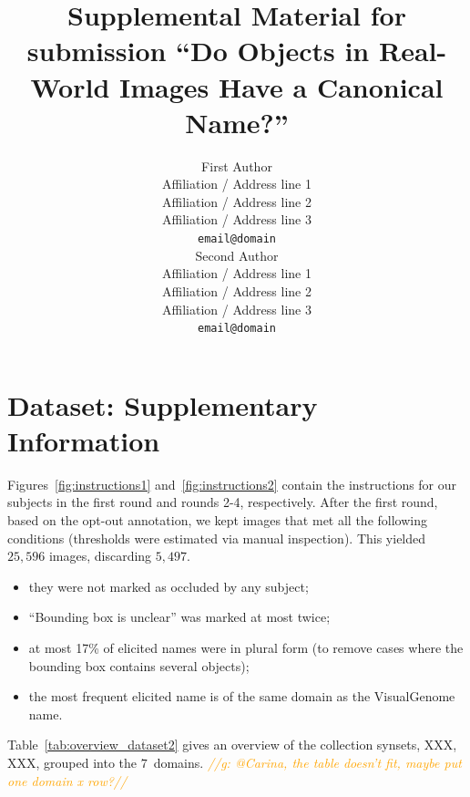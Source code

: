 \documentclass[11pt,a4paper]{article}
\title{Supplemental Material for submission ``Do Objects in Real-World Images Have a Canonical Name?''}
\author{First Author \\
  Affiliation / Address line 1 \\
  Affiliation / Address line 2 \\
  Affiliation / Address line 3 \\
  {\tt email@domain} \\\And
  Second Author \\
  Affiliation / Address line 1 \\
  Affiliation / Address line 2 \\
  Affiliation / Address line 3 \\
  {\tt email@domain} \\}
\date{}
\newcommand{\vgenome}{VisualGenome\xspace}
\newcommand{\gbt}[1]{\textcolor{orange}{\emph{//g: #1//}}}
\begin{document}
\maketitle
\section{Dataset: Supplementary Information}
\label{app:instructions}

Figures~\ref{fig:instructions1} and~\ref{fig:instructions2} contain the instructions for our subjects in the first round and rounds 2-4, respectively.
After the first round, based on the opt-out annotation, we kept images that met all the following conditions (thresholds were estimated via manual inspection). This yielded $25,596$ images, discarding $5,497$.

\begin{itemize}
\item they were not marked as occluded by any subject;
\item ``Bounding box is unclear'' was marked at most twice;
\item at most 17\% of elicited names were in plural form (to remove cases where the bounding box contains several objects);
\item the most frequent elicited name is of the same domain as the \vgenome name.
\end{itemize}

Table~\ref{tab:overview_dataset2} gives an overview of the collection synsets, XXX, XXX, grouped into the $7$~domains.
\gbt{@Carina, the table doesn't fit, maybe put one domain x row?}
\end{document}
